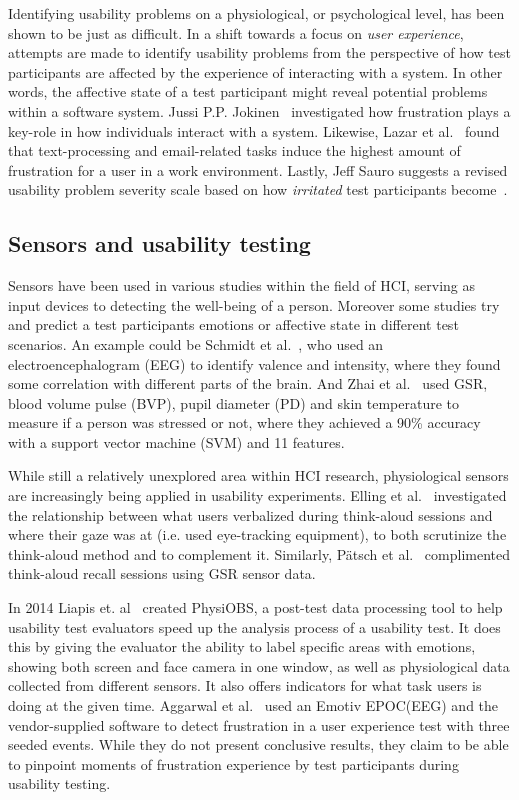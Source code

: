 Identifying usability problems on a physiological, or psychological level, has been shown to be just as difficult. In a
shift towards a focus on \textit{user experience}, attempts are made to identify usability problems
from the perspective of how test participants are affected by the experience of interacting with a system. In other
words, the affective state of a test participant might reveal potential problems within a software system. Jussi
P.P. Jokinen~\cite{workplace_up_study} investigated how frustration plays a key-role in how individuals interact with a
system. Likewise, Lazar et al.~\cite{frustration_with_computers} found that text-processing and email-related tasks
induce the highest amount of frustration for a user in a work environment. Lastly, Jeff Sauro suggests a revised usability problem severity scale based on how
\textit{irritated} test participants become~\cite{jeff_severity}.

\subsection{Sensors and usability testing}
Sensors have been used in various studies within the field of HCI, serving as input devices to detecting the well-being of a person.
Moreover some studies try and predict a test participants emotions or affective state in different test scenarios. 
An example could be Schmidt et al.~\cite{schmidt_trainor}, who used an electroencephalogram (EEG) to identify valence and intensity, where they found some correlation with different parts of the brain.
And Zhai et al.~\cite{gsr_data_processing2} used GSR, blood volume pulse (BVP), pupil diameter (PD) and skin temperature to measure if a person was stressed or not, where they achieved a 90\% accuracy with a support vector machine (SVM) and 11 features.

While still a relatively unexplored area within HCI research,
physiological sensors are increasingly being applied in usability experiments.
Elling et al.~\cite{concurrent_think_aloud_eye_tracking} investigated the
relationship between what users verbalized during think-aloud sessions and where
their gaze was at (i.e. used eye-tracking equipment), to both scrutinize the
think-aloud method and to complement it. Similarly, P\"{a}tsch et
al.~\cite{using_sensor_graphs_think_aloud} complimented think-aloud recall
sessions using GSR sensor data.

In 2014 Liapis et. al~\cite{fusion4} created PhysiOBS, a post-test data processing tool to help usability test evaluators speed up the analysis process of a usability test. It does this by giving the evaluator the ability to label specific areas with emotions, showing both screen and face camera in one window, as well as physiological data collected from different sensors. It also offers indicators for what task users is doing at the given time.
Aggarwal et al.~\cite{sensor_example} used an Emotiv EPOC(EEG) and the vendor-supplied software to detect frustration in a
user experience test with three seeded events. While they do not present conclusive results, they claim to be able to
pinpoint moments of frustration experience by test participants during usability testing.


